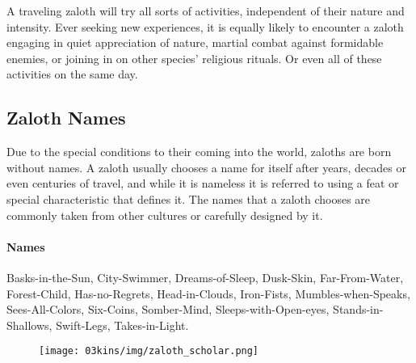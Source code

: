 \begin{linenumbers}
A traveling zaloth will try all sorts of activities, independent of their nature and intensity.
Ever seeking new experiences, it is equally likely to encounter a zaloth engaging in quiet appreciation of nature, martial combat against formidable enemies, or joining in on other species' religious rituals.
Or even all of these activities on the same day.

\subsection*{Zaloth Names}
Due to the special conditions to their coming into the world, zaloths are born without names.
A zaloth usually chooses a name for itself after years, decades or even centuries of travel, and while it is nameless it is referred to using a feat or special characteristic that defines it.
The names that a zaloth chooses are commonly taken from other cultures or carefully designed by it.

\paragraph{Names} Basks-in-the-Sun, City-Swimmer, Dreams-of-Sleep, Dusk-Skin, Far-From-Water, Forest-Child, Has-no-Regrets, Head-in-Clouds, Iron-Fists, Mumbles-when-Speaks, Sees-All-Colors, Six-Coins, Somber-Mind, Sleeps-with-Open-eyes, Stands-in-Shallows, Swift-Legs, Takes-in-Light.

\begin{figure}[!t]
    \centering
    \texttt{[image: 03kins/img/zaloth\_scholar.png]}
\end{figure}


\end{linenumbers}
